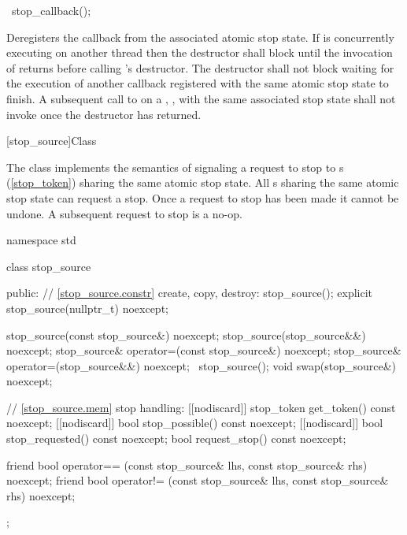 {%
\begin{itemdecl}
~stop_callback();
\end{itemdecl}
\begin{itemdescr}
  \pnum\effects Deregisters the callback from the associated atomic stop state.
                If  is concurrently executing on another thread then the destructor shall
                block until the invocation of  returns before calling 's destructor.
                The destructor shall not block waiting for the execution of another callback registered
                with the same atomic stop state to finish.
                A subsequent call to  on a , , with the same
                associated stop state shall not invoke  once the destructor has returned.
\end{itemdescr}

%
[stop_source]{Class }

\pnum
{}%
The class  implements the semantics of signaling a request to stop
to s (\ref{stop_token}) sharing the same atomic stop state.
All s sharing the same atomic stop state can request a stop.
Once a request to stop has been made it cannot be undone.
A subsequent request to stop is a no-op.

\begin{codeblock}
namespace std {
  class stop_source {
  public:
    // \ref{stop_source.constr} create, copy, destroy:
    stop_source();
    explicit stop_source(nullptr_t) noexcept;

    stop_source(const stop_source&) noexcept;
    stop_source(stop_source&&) noexcept;
    stop_source& operator=(const stop_source&) noexcept;
    stop_source& operator=(stop_source&&) noexcept;
    ~stop_source();
    void swap(stop_source&) noexcept;

    // \ref{stop_source.mem} stop handling:
    [[nodiscard]] stop_token get_token() const noexcept;
    [[nodiscard]] bool stop_possible() const noexcept;
    [[nodiscard]] bool stop_requested() const noexcept;
    bool request_stop() const noexcept;

    friend bool operator== (const stop_source& lhs, const stop_source& rhs) noexcept;
    friend bool operator!= (const stop_source& lhs, const stop_source& rhs) noexcept;
  };
}
\end{codeblock}

}
